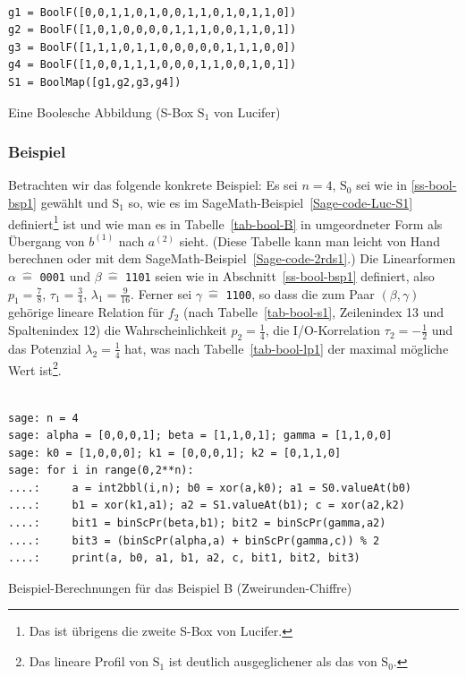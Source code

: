 \begin{refsegment}
\begin{sagecode}
\begin{verbatim}

g1 = BoolF([0,0,1,1,0,1,0,0,1,1,0,1,0,1,1,0])
g2 = BoolF([1,0,1,0,0,0,0,1,1,1,0,0,1,1,0,1])
g3 = BoolF([1,1,1,0,1,1,0,0,0,0,0,1,1,1,0,0])
g4 = BoolF([1,0,0,1,1,1,0,0,0,1,1,0,0,1,0,1])
S1 = BoolMap([g1,g2,g3,g4])
\end{verbatim}
\caption{Eine Boolesche Abbildung (S-Box $\mathrm{S}_1$ von
   {\sc Lucifer})}\label{Sage-code-Luc-S1}
\end{sagecode}


\subsubsection*{Beispiel}

Betrachten wir das folgende konkrete Beispiel:
Es sei $n = 4$, $\mathrm{S_0}$ sei wie in \ref{ss-bool-bsp1} gewählt
und $\mathrm{S_1}$ so, wie es im SageMath-Beispiel~\ref{Sage-code-Luc-S1}
definiert\footnote{%
  Das ist übrigens die zweite S-Box von Lucifer.
} ist und wie man es in Tabelle~\ref{tab-bool-B} in umgeordneter Form als
Übergang von $b^{(1)}$ nach $a^{(2)}$ sieht. (Diese Tabelle kann man leicht von
Hand berechnen oder mit dem SageMath-Beispiel~\ref{Sage-code-2rds1}.)
Die Linearformen $\alpha \:\hat{=}$ \verb:0001: und $\beta \:\hat{=}$ \verb:1101:
seien wie in Abschnitt~\ref{ss-bool-bsp1} definiert, also $p_1 = \frac{7}{8}$,
$\tau_1 = \frac{3}{4}$, $\lambda_1 = \frac{9}{16}$. Ferner sei
$\gamma \:\hat{=}$ \verb:1100:, so dass die zum Paar
$(\beta,\gamma)$ gehörige lineare Relation für $f_2$ (nach
Tabelle~\ref{tab-bool-s1}, Zeilenindex 13 und Spaltenindex 12)
die Wahrscheinlichkeit $p_2 = \frac{1}{4}$, die I/O-Korrelation
$\tau_2 = -\frac{1}{2}$ und das Potenzial
$\lambda_2 = \frac{1}{4}$ hat, was nach Tabelle~\ref{tab-bool-lp1}
der maximal mögliche Wert ist\footnote{%
   Das lineare Profil von $\mathrm{S}_1$ ist deutlich ausgeglichener
   als das von $\mathrm{S}_0$.
}.

\begin{sagecode}
\begin{verbatim}

sage: n = 4
sage: alpha = [0,0,0,1]; beta = [1,1,0,1]; gamma = [1,1,0,0]
sage: k0 = [1,0,0,0]; k1 = [0,0,0,1]; k2 = [0,1,1,0]
sage: for i in range(0,2**n):
....:     a = int2bbl(i,n); b0 = xor(a,k0); a1 = S0.valueAt(b0)
....:     b1 = xor(k1,a1); a2 = S1.valueAt(b1); c = xor(a2,k2)
....:     bit1 = binScPr(beta,b1); bit2 = binScPr(gamma,a2)
....:     bit3 = (binScPr(alpha,a) + binScPr(gamma,c)) % 2
....:     print(a, b0, a1, b1, a2, c, bit1, bit2, bit3)
\end{verbatim}
\caption{Beispiel-Berechnungen für das Beispiel B (Zweirunden-Chiffre)}\label{Sage-code-2rds1}
\end{sagecode}


\end{refsegment}

